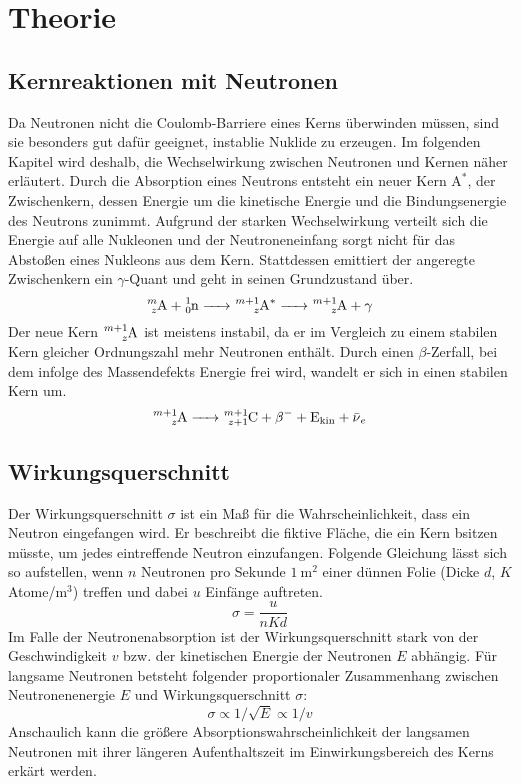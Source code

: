 \section{Theorie}
\label{sec:Theorie}

\subsection{Kernreaktionen mit Neutronen}
\label{sec:kr}

Da Neutronen nicht die Coulomb-Barriere eines Kerns überwinden müssen, sind sie besonders gut dafür geeignet, instablie Nuklide zu erzeugen.
Im folgenden Kapitel wird deshalb, die Wechselwirkung zwischen Neutronen und Kernen näher erläutert.
Durch die Absorption eines Neutrons entsteht ein neuer Kern $\text{A}^*$, der Zwischenkern,
dessen Energie um die kinetische Energie und die Bindungsenergie des Neutrons zunimmt.
Aufgrund der starken Wechselwirkung verteilt sich die Energie auf alle Nukleonen und der Neutroneneinfang sorgt nicht für das Abstoßen eines Nukleons aus dem Kern.
Stattdessen emittiert der angeregte Zwischenkern ein $\gamma$-Quant und geht in seinen Grundzustand über.
\begin{equation}
  \ce{^{m}_zA + ^{1}_0n -> ^{m+1}_zA^* -> ^{m+1}_zA + \gamma }
\end{equation}
Der neue Kern $\ce{^{m+1}_zA}$ ist meistens instabil, da er im Vergleich zu einem stabilen Kern gleicher Ordnungszahl mehr Neutronen enthält.
Durch einen $\beta$-Zerfall, bei dem infolge des Massendefekts Energie frei wird,
wandelt er sich in einen stabilen Kern um. \cite{V702}
\begin{equation}
  \ce{^{m+1}_zA -> ^{m+1}_{z+1}C + \beta^- + E_{kin} + \bar{\nu}_e}
\end{equation}

\subsection{Wirkungsquerschnitt}

Der Wirkungsquerschnitt $\sigma$ ist ein Maß für die Wahrscheinlichkeit, dass ein Neutron eingefangen wird.
Er beschreibt die fiktive Fläche, die ein Kern bsitzen müsste, um jedes eintreffende Neutron einzufangen.
Folgende Gleichung lässt sich so aufstellen,
wenn $n$ Neutronen pro Sekunde  $\SI{1}{\square\meter}$ einer dünnen Folie (Dicke $d$, $K$ Atome/$\si{\cubic\meter}$) treffen und dabei $u$ Einfänge auftreten.
\begin{equation}
  \sigma = \frac{u}{nKd}
\end{equation}
Im Falle der Neutronenabsorption ist der Wirkungsquerschnitt stark von der Geschwindigkeit $v$ bzw. der kinetischen Energie der Neutronen $E$ abhängig.
Für langsame Neutronen betsteht folgender proportionaler Zusammenhang zwischen Neutronenenergie $E$ und Wirkungsquerschnitt $\sigma$:
\begin{equation}
  \sigma \propto 1/\sqrt{E} \propto 1/v
\end{equation}
Anschaulich kann die größere Absorptionswahrscheinlichkeit der langsamen Neutronen mit ihrer längeren Aufenthaltszeit im Einwirkungsbereich des Kerns erkärt werden. \cite{V702}


